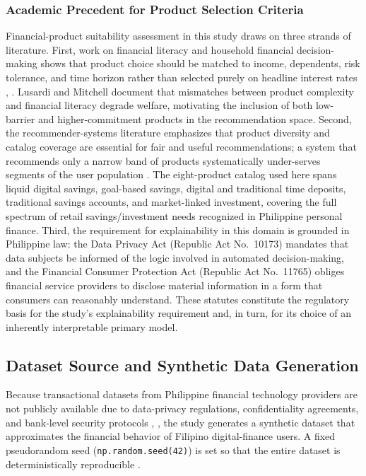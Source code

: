 \documentclass[journal]{./IEEE/IEEEtran}
\begin{document}
\subsubsection{Academic Precedent for Product Selection Criteria}

Financial-product suitability assessment in this study draws on three strands of literature. First, work on financial literacy and household financial decision-making shows that product choice should be matched to income, dependents, risk tolerance, and time horizon rather than selected purely on headline interest rates \cite{ref43}, \cite{ref55}. Lusardi and Mitchell \cite{ref43} document that mismatches between product complexity and financial literacy degrade welfare, motivating the inclusion of both low-barrier and higher-commitment products in the recommendation space. Second, the recommender-systems literature emphasizes that product diversity and catalog coverage are essential for fair and useful recommendations; a system that recommends only a narrow band of products systematically under-serves segments of the user population \cite{ref13}. The eight-product catalog used here spans liquid digital savings, goal-based savings, digital and traditional time deposits, traditional savings accounts, and market-linked investment, covering the full spectrum of retail savings/investment needs recognized in Philippine personal finance. Third, the requirement for explainability in this domain is grounded in Philippine law: the Data Privacy Act (Republic Act No.~10173) \cite{ref45} mandates that data subjects be informed of the logic involved in automated decision-making, and the Financial Consumer Protection Act (Republic Act No.~11765) \cite{ref44} obliges financial service providers to disclose material information in a form that consumers can reasonably understand. These statutes constitute the regulatory basis for the study's explainability requirement and, in turn, for its choice of an inherently interpretable primary model.

\subsection{Dataset Source and Synthetic Data Generation}

Because transactional datasets from Philippine financial technology providers are not publicly available due to data-privacy regulations, confidentiality agreements, and bank-level security protocols \cite{ref45}, \cite{ref46}, the study generates a synthetic dataset that approximates the financial behavior of Filipino digital-finance users. A fixed pseudorandom seed (\texttt{np.random.seed(42)}) is set so that the entire dataset is deterministically reproducible \cite{ref60}.
\end{document}
